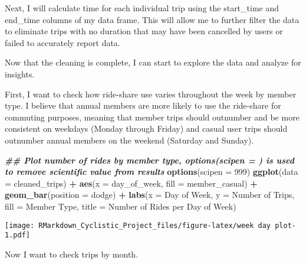 \documentclass[
]{article}
\newenvironment{Shaded}{\begin{snugshade}}{\end{snugshade}}
\newcommand{\AttributeTok}[1]{\textcolor[rgb]{0.13,0.29,0.53}{#1}}
\newcommand{\DecValTok}[1]{\textcolor[rgb]{0.00,0.00,0.81}{#1}}
\newcommand{\DocumentationTok}[1]{\textcolor[rgb]{0.56,0.35,0.01}{\textbf{\textit{#1}}}}
\newcommand{\FunctionTok}[1]{\textcolor[rgb]{0.13,0.29,0.53}{\textbf{#1}}}
\newcommand{\NormalTok}[1]{#1}
\newcommand{\SpecialCharTok}[1]{\textcolor[rgb]{0.81,0.36,0.00}{\textbf{#1}}}
\newcommand{\StringTok}[1]{\textcolor[rgb]{0.31,0.60,0.02}{#1}}
\begin{document}
Next, I will calculate time for each individual trip using the
start\_time and end\_time columns of my data frame. This will allow me
to further filter the data to eliminate trips with no duration that may
have been cancelled by users or failed to accurately report data.

Now that the cleaning is complete, I can start to explore the data and
analyze for insights.

First, I want to check how ride-share use varies throughout the week by
member type. I believe that annual members are more likely to use the
ride-share for commuting purposes, meaning that member trips should
outnumber and be more consistent on weekdays (Monday through Friday) and
casual user trips should outnumber annual members on the weekend
(Saturday and Sunday).

\begin{Shaded}
\begin{Highlighting}[]
\DocumentationTok{\#\# Plot number of rides by member type, options(scipen = ) is used to remove scientific value from results}
\FunctionTok{options}\NormalTok{(}\AttributeTok{scipen =} \DecValTok{999}\NormalTok{)}
\FunctionTok{ggplot}\NormalTok{(}\AttributeTok{data =}\NormalTok{ cleaned\_trips) }\SpecialCharTok{+}
\FunctionTok{aes}\NormalTok{(}\AttributeTok{x =}\NormalTok{ day\_of\_week, }\AttributeTok{fill =}\NormalTok{ member\_casual) }\SpecialCharTok{+}
\FunctionTok{geom\_bar}\NormalTok{(}\AttributeTok{position =} \StringTok{\textquotesingle{}dodge\textquotesingle{}}\NormalTok{) }\SpecialCharTok{+}
\FunctionTok{labs}\NormalTok{(}\AttributeTok{x =} \StringTok{\textquotesingle{}Day of Week\textquotesingle{}}\NormalTok{, }\AttributeTok{y =} \StringTok{\textquotesingle{}Number of Trips\textquotesingle{}}\NormalTok{, }\AttributeTok{fill =} \StringTok{\textquotesingle{}Member Type\textquotesingle{}}\NormalTok{, }\AttributeTok{title =} \StringTok{\textquotesingle{}Number of Rides per Day of Week\textquotesingle{}}\NormalTok{)}
\end{Highlighting}
\end{Shaded}

\texttt{[image: RMarkdown\_Cyclistic\_Project\_files/figure-latex/week day plot-1.pdf]}

Now I want to check trips by month.
\end{document}
